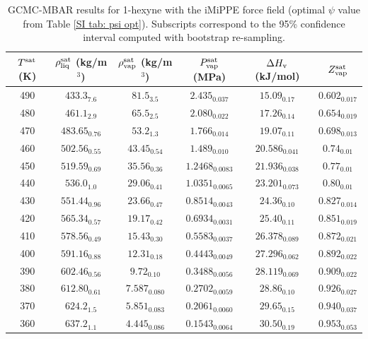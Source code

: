 \documentclass[journal=jctc,manuscript=article]{achemso}
\begin{document}
\begin{table}[htb!]
	\caption{GCMC-MBAR results for 1-hexyne with the iMiPPE force field (optimal $\psi$ value from Table \ref{SI tab: psi opt}). Subscripts correspond to the 95\% confidence interval computed with bootstrap re-sampling.}
	\begin{center}
		\begin{tabular}{|c|c|c|c|c|c|}
			\hline
			$T^{\rm sat}$ (K) & $\rho_{\rm liq}^{\rm sat}$ (kg/m$^3$) & $\rho_{\rm vap}^{\rm sat}$ (kg/m$^3$) & $P_{\rm vap}^{\rm sat}$ (MPa) & $\Delta H_{\rm v}$ (kJ/mol) & $Z_{\rm vap}^{\rm sat}$ \\ \hline
			490 & $433.3_{7.6}$ & $81.5_{3.5}$ & $2.435_{0.037}$ & $15.09_{0.17}$ & $0.602_{0.017}$ \\
			480 & $461.1_{2.9}$ & $65.5_{2.5}$ & $2.080_{0.022}$ & $17.26_{0.14}$ & $0.654_{0.019}$ \\
			470 & $483.65_{0.76}$ & $53.2_{1.3}$ & $1.766_{0.014}$ & $19.07_{0.11}$ & $0.698_{0.013}$ \\
			460 & $502.56_{0.55}$ & $43.45_{0.54}$ & $1.489_{0.010}$ & $20.586_{0.041}$ & $0.74_{0.01}$ \\
			450 & $519.59_{0.69}$ & $35.56_{0.36}$ & $1.2468_{0.0083}$ & $21.936_{0.038}$ & $0.77_{0.01}$ \\
			440 & $536.0_{1.0}$ & $29.06_{0.41}$ & $1.0351_{0.0065}$ & $23.201_{0.073}$ & $0.80_{0.01}$ \\
			430 & $551.44_{0.96}$ & $23.66_{0.47}$ & $0.8514_{0.0043}$ & $24.36_{0.10}$ & $0.827_{0.014}$ \\
			420 & $565.34_{0.57}$ & $19.17_{0.42}$ & $0.6934_{0.0031}$ & $25.40_{0.11}$ & $0.851_{0.019}$ \\
			410 & $578.56_{0.49}$ & $15.43_{0.30}$ & $0.5583_{0.0037}$ & $26.378_{0.089}$ & $0.872_{0.021}$ \\
			400 & $591.16_{0.88}$ & $12.31_{0.18}$ & $0.4443_{0.0049}$ & $27.296_{0.062}$ & $0.892_{0.022}$ \\
			390 & $602.46_{0.56}$ & $9.72_{0.10}$ & $0.3488_{0.0056}$ & $28.119_{0.069}$ & $0.909_{0.022}$ \\
			380 & $612.80_{0.61}$ & $7.587_{0.080}$ & $0.2702_{0.0059}$ & $28.86_{0.10}$ & $0.926_{0.027}$ \\
			370 & $624.2_{1.5}$ & $5.851_{0.083}$ & $0.2061_{0.0060}$ & $29.65_{0.15}$ & $0.940_{0.037}$ \\
			360 & $637.2_{1.1}$ & $4.445_{0.086}$ & $0.1543_{0.0064}$ & $30.50_{0.19}$ & $0.953_{0.053}$ \\
			\hline
		\end{tabular}
	\end{center}
\end{table}
\end{document}
